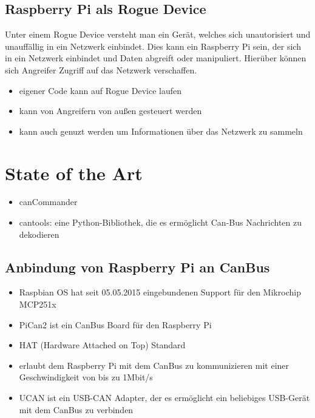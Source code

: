 \subsection{Raspberry Pi als Rogue Device}
Unter einem Rogue Device versteht man ein Gerät, welches sich unautorisiert und unauffällig in ein Netzwerk einbindet. \cite{Scarfone2008}
Dies kann ein Raspberry Pi sein, der sich in ein Netzwerk einbindet und Daten abgreift oder manipuliert. Hierüber können 
sich Angreifer Zugriff auf das Netzwerk verschaffen. 
\begin{itemize}
    \item eigener Code kann auf Rogue Device laufen
    \item kann von Angreifern von außen gesteuert werden
    \item kann auch genuzt werden um Informationen über das Netzwerk zu sammeln
\end{itemize}

\section{State of the Art}
\begin{itemize}
    \item canCommander
    \item cantools: eine Python-Bibliothek, die es ermöglicht Can-Bus Nachrichten zu dekodieren
\end{itemize}
\subsection{Anbindung von Raspberry Pi an CanBus}
\begin{itemize}
    \item Raspbian OS hat seit 05.05.2015 eingebundenen Support für den Mikrochip MCP251x
\end{itemize}
\cite{Salunkhe2016}
\begin{itemize}
    \item PiCan2 ist ein CanBus Board für den Raspberry Pi
    \item HAT (Hardware Attached on Top) Standard
    \item erlaubt dem Raspberry Pi mit dem CanBus zu kommunizieren mit einer Geschwindigkeit von bis zu 1Mbit/s
    \item UCAN ist ein USB-CAN Adapter, der es ermöglicht ein beliebiges USB-Gerät mit dem CanBus zu verbinden
\end{itemize}
\cite{Pant2019}
